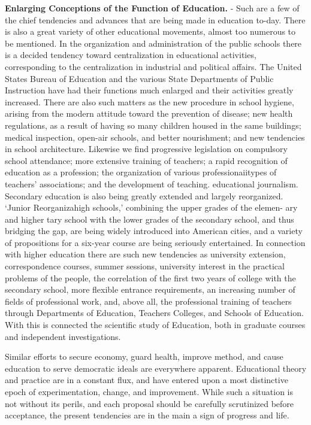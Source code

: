 \documentclass[]{book}
\begin{document}
\textbf{Enlarging Conceptions of the Function of Education.} - Such are a few of the chief tendencies and advances that are being made in education to-day. There is also a great variety of other educational movements, almost too numerous to be mentioned. In the organization and administration of the public schools there is a decided tendency toward centralization in educational activities, corresponding to the centralization in industrial and political affairs. The United States Bureau of Education and the various State Departments of Public Instruction have had their functions much enlarged and their activities greatly increased. There are also such matters as the new procedure in school hygiene, arising from the modern attitude toward the prevention of disease; new health regulations, as a result of having so many children housed in the same buildings; medical inspection, open-air schools, and better nourishment; and new tendencies in school architecture. Likewise we find progressive legislation on compulsory school attendance; more extensive training of teachers; a rapid recognition of education as a profession; the organization of various professionaiitypes of teachers' associations; and the development of teaching. educational journalism. Secondary education is also being greatly extended and largely reorganized. `Junior Reorganizahigh schools,' combining the upper grades of the elemen- ary and higher tary school with the lower grades of the secondary school, and thus bridging the gap, are being widely introduced into American cities, and a variety of propositions for a six-year course are being seriously entertained. In connection with higher education there are such new tendencies as university extension, correspondence courses, summer sessions, university interest in the practical problems of the people, the correlation of the first two years of college with the secondary school, more flexible entrance requirements, an increasing number of fields of professional work, and, above all, the professional training of teachers through Departments of Education, Teachers Colleges, and Schools of Education. With this is connected the scientific study of Education, both in graduate courses and independent investigations.

Similar efforts to secure economy, guard health, improve method, and cause education to serve democratic ideals are everywhere apparent. Educational theory and practice are in a constant flux, and have entered upon a most distinctive epoch of experimentation, change, and improvement. While such a situation is not without its perils, and each proposal should be carefully scrutinized before acceptance, the present tendencies are in the main a sign of progress and life.
\end{document}
